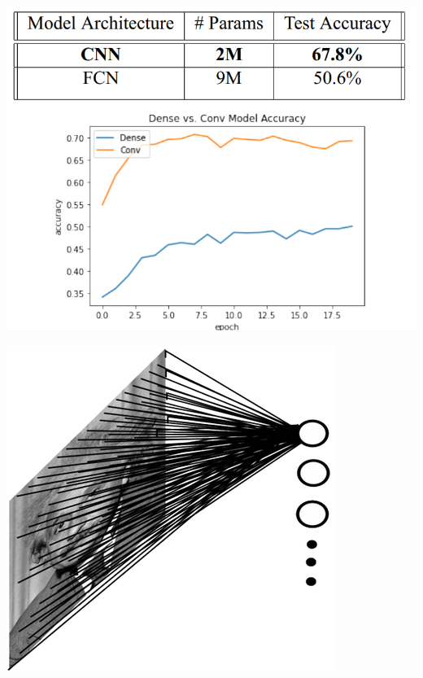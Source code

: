 \documentclass[default, aspectratio=169]{beamer}
\begin{document}
\begin{frame}
	\centering
	\begin{minipage}{0.5\textwidth}
		\centering
		\includegraphics[keepaspectratio, scale=0.55]{pic/param.png}
	\end{minipage}
	\hfill
	\begin{minipage}{0.4\textwidth}
		\centering
		\includegraphics[keepaspectratio, scale=0.4]{pic/FCN.png} \\
		\vspace{0.3cm} %

\end{minipage}
\end{frame}
\end{document}
